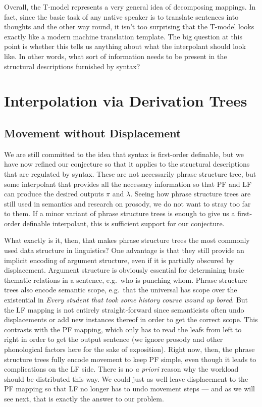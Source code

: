 Overall, the T-model represents a very general idea of decomposing mappings.
In fact, since the basic task of any native speaker is to translate sentences into thoughts and the other way round, it isn't too surprising that the T-model looks exactly like a modern machine translation template.
The big question at this point is whether this tells us anything about what the interpolant should look like.
In other words, what sort of information needs to be present in the structural descriptions furnished by syntax?

\section{Interpolation via Derivation Trees}

\subsection{Movement without Displacement}
We are still committed to the idea that syntax is first-order definable, but we have now refined our conjecture so that it applies to the structural descriptions that are regulated by syntax. 
These are not necessarily phrase structure tree, but some interpolant that provides all the necessary information so that PF and LF can produce the desired outputs $\pi$ and $\lambda$.
Seeing how phrase structure trees are still used in semantics and research on prosody, we do not want to stray too far to them.
If a minor variant of phrase structure trees is enough to give us a first-order definable interpolant, this is sufficient support for our conjecture.

What exactly is it, then, that makes phrase structure trees the most commonly used data structure in linguistics?
One advantage is that they still provide an implicit encoding of argument structure, even if it is partially obscured by displacement.
Argument structure is obviously essential for determining basic thematic relations in a sentence, e.g.\ who is punching whom.
Phrase structure trees also encode semantic scope, e.g.\ that the universal has scope over the existential in \emph{Every student that took some history course wound up bored}.
But the LF mapping is not entirely straight-forward since semanticists often undo displacements or add new instances thereof in order to get the correct scope.
This contrasts with the PF mapping, which only has to read the leafs from left to right in order to get the output sentence (we ignore prosody and other phonological factors here for the sake of exposition).
Right now, then, the phrase structure trees fully encode movement to keep PF simple, even though it leads to complications on the LF side.
There is no \emph{a priori} reason why the workload should be distributed this way.
We could just as well leave displacement to the PF mapping so that LF no longer has to undo movement steps --- and as we will see next, that is exactly the answer to our problem.

